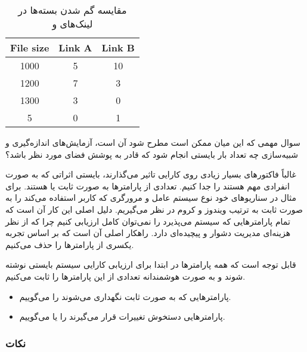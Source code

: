 \begin{LTR}
    \begin{table}[H]
        \centering
        \label{fig:packetLostLinks}
        \caption{مقایسه گم شدن بسته‌ها در لینک‌های  و }
        \begin{tabular}{ccc}
            \textbf{File size} & \textbf{Link A} & \textbf{Link B} \\ \hline
            1000 & 5 & 10 \\
            1200 & 7 & 3 \\
            1300 & 3 & 0 \\
            5 & 0 & 1 \\
        \end{tabular}
    \end{table}
\end{LTR}

سوال مهمی که این میان ممکن است مطرح شود آن است، آزمایش‌های اندازه‌گیری و
شبیه‌سازی چه تعداد بار بایستی انجام شود که قادر به پوشش فضای مورد نظر باشد؟

غالباً فاکتور‌های بسیار زیادی روی کارایی تاثیر می‌گذارند، بایستی اثراتی که به
صورت انفرادی مهم هستند را جدا کنیم. تعدادی از پارامتر‌ها به صورت ثابت یا
 هستند. برای مثال در سناریو‌های خود نوع سیستم عامل و مرورگری که کاربر
استفاده می‌کند را به صورت ثابت به ترتیب ویندوز و کروم در نظر می‌گیریم. دلیل اصلی
این کار آن است که تمام پارامتر‌هایی که سیستم می‌پذیرد را نمی‌توان کامل ارزیابی
کنیم چرا که از نظر هزینه‌ای مدیریت دشوار و پیچیده‌ای دارد. راهکار اصلی آن است که
بر اساس تجربه یکسری از پارامتر‌ها را حذف می‌کنیم.

قابل توجه است که همه پارامتر‌ها در ابتدا برای ارزیابی کارایی سیستم بایستی نوشته
شوند و به صورت هوشمندانه تعدادی از این پارامتر‌ها را ثابت می‌کنیم.

\begin{itemize}
    \item پارامتر‌هایی که به صورت ثابت نگهداری می‌شوند را 
    می‌گوییم.
    \item پارامتر‌هایی دستخوش تغییرات قرار می‌گیرند را  یا
     می‌گوییم.
\end{itemize}

\subsubsection*{نکات}


